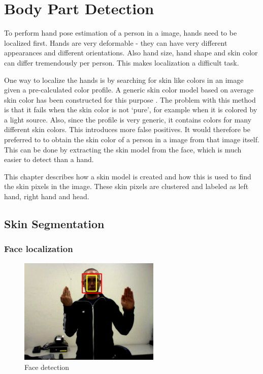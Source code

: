 
\chapter{Body Part Detection}
\label{ch:bodyparts}

To perform hand pose estimation of a person in a image, hands need to be localized first. Hands are very deformable - they can have very different appearances and different orientations. Also hand size, hand shape and skin color can differ tremendously per person. This makes localization a  difficult task. 

One way to localize the hands is by searching for skin like colors in an image given a pre-calculated color profile. A generic skin color model based on average skin color has been constructed for this purpose \citep{Jones1999}. The problem with this method is that it fails when the skin color is not `pure', for example when it is colored by a light source. Also, since the profile is very generic, it contains colors for many different skin colors. This introduces more false positives. It would therefore be preferred to to obtain the skin color of a person in a image from that image itself. This can be done by extracting the skin model from the face, which is much easier to detect than a hand.

This chapter describes how a skin model is created and how this is used to find the skin pixels in the image. These  skin pixels are clustered and labeled as left hand, right hand and head. 

\section{Skin Segmentation}
\label{sec:skinmodel}

\subsection*{Face localization}

\begin{figure}
  \center{}
    \includegraphics[width=0.6\textwidth]{figures/pipeline/detected.jpg}
  \caption{Face detection}
  \label{fig:face_detection}
\end{figure}

